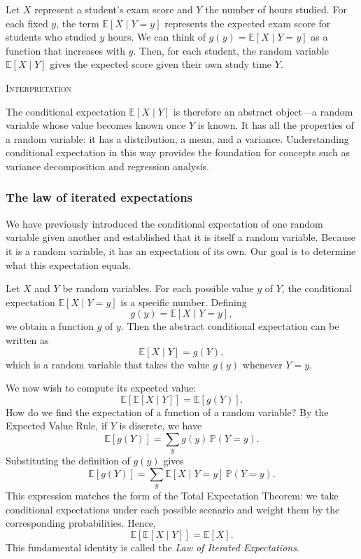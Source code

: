 Let \( X \) represent a student's exam score and \( Y \) the number of hours studied.  
For each fixed \( y \), the term \( \mathbb{E}[X \mid Y = y] \) represents the expected exam score for students who studied \( y \) hours.  
We can think of \( g(y) = \mathbb{E}[X \mid Y = y] \) as a function that increases with \( y \).  
Then, for each student, the random variable \( \mathbb{E}[X \mid Y] \) gives the expected score given their own study time \( Y \).  

\bigskip
\textsc{Interpretation}

The conditional expectation \( \mathbb{E}[X \mid Y] \) is therefore an abstract object—a random variable whose value becomes known once \( Y \) is known.  
It has all the properties of a random variable: it has a distribution, a mean, and a variance.  
Understanding conditional expectation in this way provides the foundation for concepts such as variance decomposition and regression analysis.


\subsubsection{The law of iterated expectations}

We have previously introduced the conditional expectation of one random variable given another and established that it is itself a random variable.  
Because it is a random variable, it has an expectation of its own.  
Our goal is to determine what this expectation equals.

Let \( X \) and \( Y \) be random variables.  
For each possible value \( y \) of \( Y \), the conditional expectation \( \mathbb{E}[X \mid Y = y] \) is a specific number.  
Defining
\[
g(y) = \mathbb{E}[X \mid Y = y],
\]
we obtain a function \( g \) of \( y \).  
Then the abstract conditional expectation can be written as
\[
\mathbb{E}[X \mid Y] = g(Y),
\]
which is a random variable that takes the value \( g(y) \) whenever \( Y = y \).

We now wish to compute its expected value:
\[
\mathbb{E}[\mathbb{E}[X \mid Y]] = \mathbb{E}[g(Y)].
\]
How do we find the expectation of a function of a random variable?  
By the Expected Value Rule, if \( Y \) is discrete, we have
\[
\mathbb{E}[g(Y)] = \sum_{y} g(y)\,\mathbb{P}(Y = y).
\]
Substituting the definition of \( g(y) \) gives
\[
\mathbb{E}[g(Y)]
=
\sum_{y} \mathbb{E}[X \mid Y = y]\,\mathbb{P}(Y = y).
\]
This expression matches the form of the Total Expectation Theorem: we take conditional expectations under each possible scenario and weight them by the corresponding probabilities.  
Hence,
\[
\mathbb{E}[\mathbb{E}[X \mid Y]] = \mathbb{E}[X].
\]
This fundamental identity is called the \textit{Law of Iterated Expectations}.  

